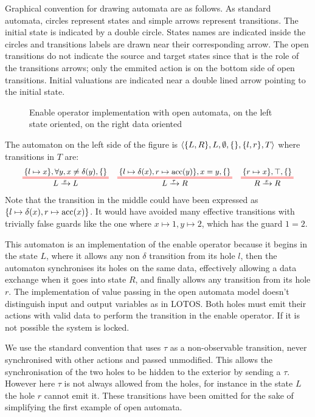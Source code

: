 \documentclass{article}
\begin{document}
\begin{exi}
Graphical convention for drawing automata are as follows.
As standard automata, circles represent states and simple arrows represent transitions.
The initial state is indicated by a double circle.
States names are indicated inside the circles and transitions labels are drawn near their corresponding arrow.
The open transitions do not indicate the source and target states since that is the role of the transitions arrows; only the emmited action is on the bottom side of open transitions.
Initial valuations are indicated near a double lined arrow pointing to the initial state.

\begin{figure}
\centering

\vrule

\caption{Enable operator implementation with open automata, on the left state oriented, on the right data oriented}
\label{fig:enable}
\end{figure}
The automaton on the left side of the figure is \(\left<{\left\{L, R\right\}},L,\emptyset,{\left\{\right\}},{\left\{l, r\right\}},T\right>\) where transitions in \(T\) are:
\begin{align*}
	\OT{L}{L}{x}{\mbrc{l \mapsto x}}{\forall y, x \neq \delta\mpar{y}}{\mbrc{}} &&
	\OT{L}{R}{\tau}{\mbrc{l \mapsto \delta\mpar{x}, r \mapsto \act{acc}\mpar{y}}}{x = y}{\mbrc{}} &&
	\OT{R}{R}{x}{\mbrc{r \mapsto x}}{\top}{\mbrc{}}
\end{align*}
Note that the transition in the middle could have been expressed as \({\left\{l \mapsto \delta{\left(x\right)}, r \mapsto \mathrm{acc}{\left(x\right)}\right\}}\).
It would have avoided many effective transitions with trivially false guards like the one where \(x \mapsto 1, y \mapsto 2\), which has the guard \(1 = 2\). 

This automaton is an implementation of the enable operator because it begins in the state \(L\), where it allows any non \(\delta\) transition from its hole \(l\), then the automaton synchronises its holes on the same data, effectively allowing a data exchange when it goes into state \(R\), and finally allows any transition from its hole \(r\).
The implementation of value passing in the open automata model doesn't distinguish input and output variables as in LOTOS.
Both holes must emit their actions with valid data to perform the transition in the enable operator.
If it is not possible the system is locked.

We use the standard convention that uses \(\tau\) as a non-observable transition, never synchronised with other actions and passed unmodified.
This allows the synchronisation of the two holes to be hidden to the exterior by sending a \(\tau\).
However here \(\tau\) is not always allowed from the holes, for instance in the state \(L\) the hole \(r\) cannot emit it.
These transitions have been omitted for the sake of simplifying the first example of open automata.
\end{exi}
\end{document}
